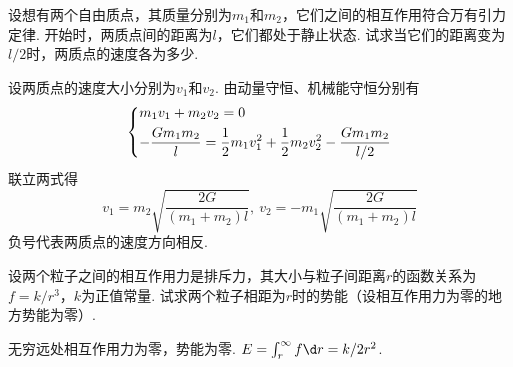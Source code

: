 \begin{problem}
    设想有两个自由质点，其质量分别为$m_1$和$m_2$，它们之间的相互作用符合万有引力定律. 开始时，两质点间的距离为$l$，它们都处于静止状态. 试求当它们的距离变为$l/2$时，两质点的速度各为多少.
\end{problem}
\begin{solution}
    设两质点的速度大小分别为$v_1$和$v_2$. 由动量守恒、机械能守恒分别有
    \[\begin{dcases}
        m_1v_1+m_2v_2=0\\
        -\frac{Gm_1m_2}{l}=\frac12m_1v_1^2+\frac12m_2v_2^2-\frac{Gm_1m_2}{l/2}
    \end{dcases}\]
    联立两式得
    \[v_1=m_2\sqrt{\frac{2G}{(m_1+m_2)l}},\ v_2=-m_1\sqrt{\frac{2G}{(m_1+m_2)l}}\]
    负号代表两质点的速度方向相反.
\end{solution}

\begin{problem}
    设两个粒子之间的相互作用力是排斥力，其大小与粒子间距离$r$的函数关系为$f=k/r^3$，$k$为正值常量. 试求两个粒子相距为$r$时的势能（设相互作用力为零的地方势能为零）.
\end{problem}
\begin{solution}
    无穷远处相互作用力为零，势能为零. $E=\int_r^{\infty}{f\d r}=k/2r^2$.
\end{solution}

